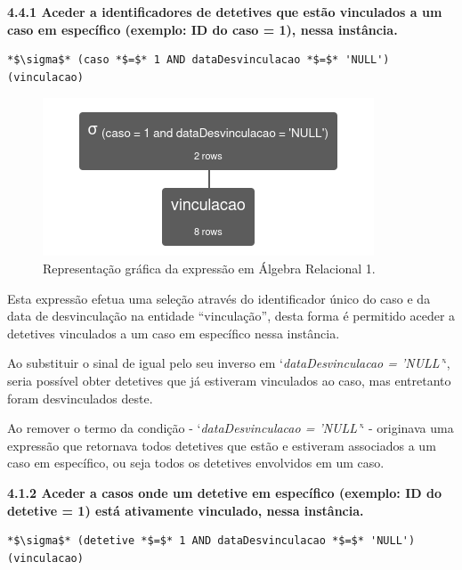 \documentclass[a4paper,12pt]{scrreprt}
\begin{document}
\vspace{0.5cm}
{\large\textbf{4.4.1 Aceder a identificadores de detetives que estão vinculados a um caso em específico (exemplo: ID do caso = 1), nessa instância.}}

\vspace{0.2cm}
\begin{lstlisting}[escapechar=*]
*$\sigma$* (caso *$=$* 1 AND dataDesvinculacao *$=$* 'NULL') (vinculacao)
\end{lstlisting}

\begin{figure}[!ht]
    \centering
    \includegraphics[scale=0.9]{images/relax/1.png}
    \caption{Representação gráfica da expressão em Álgebra Relacional 1.}
 \end{figure}
\vspace{0.2cm}

Esta expressão efetua uma seleção através do identificador único do caso e da data de desvinculação na entidade “vinculação”, desta forma é permitido aceder a detetives vinculados a um caso em específico nessa instância.

Ao substituir o sinal de igual pelo seu inverso em `\textit{dataDesvinculacao = 'NULL'}`, seria possível obter detetives que já estiveram vinculados ao caso, mas entretanto foram desvinculados deste.

Ao remover o termo da condição - `\textit{dataDesvinculacao = 'NULL'}` - originava uma expressão que retornava todos detetives que estão e estiveram associados a um caso em específico, ou seja todos os detetives envolvidos em um caso.

\clearpage %
{\large\textbf{4.1.2 Aceder a casos onde um detetive em específico (exemplo: ID do detetive = 1) está ativamente vinculado, nessa instância.}}

\vspace{0.2cm}
\begin{lstlisting}[escapechar=*]
*$\sigma$* (detetive *$=$* 1 AND dataDesvinculacao *$=$* 'NULL') (vinculacao)
\end{lstlisting}
\end{document}
